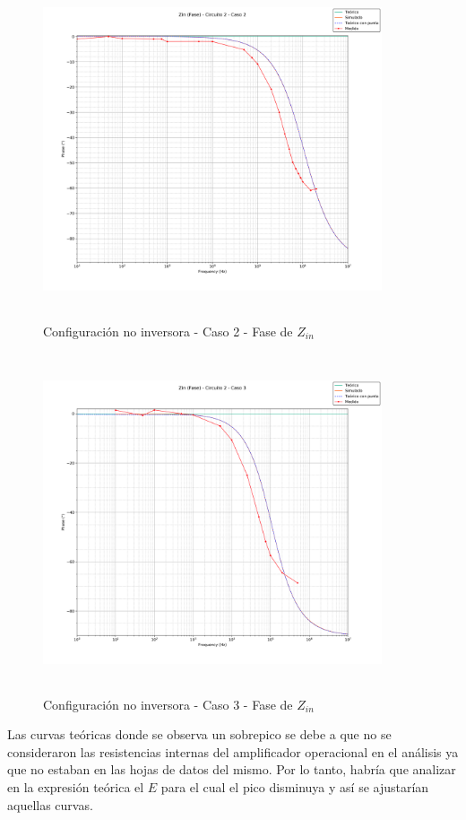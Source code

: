 \begin{figure}[H] %
	\centering
	\includegraphics[width=10cm,height=10cm,keepaspectratio]{../EJ1/00GRAFICOS/c2c2/c2c2zinFASE.png}
	\caption{Configuración no inversora - Caso 2 - Fase de $Z_{in}$}
	\label{c2c2zinP}
\end{figure}


\begin{figure}[H] %
	\centering
	\includegraphics[width=10cm,height=10cm,keepaspectratio]{../EJ1/00GRAFICOS/c2c3/c2c3zinFASE.png}
	\caption{Configuración no inversora - Caso 3 - Fase de $Z_{in}$}
	\label{c2c3zinP}
\end{figure}

Las curvas te\'oricas donde se observa un sobrepico se debe a que no se consideraron las resistencias internas del amplificador operacional en el an\'alisis ya que no estaban en las hojas de datos del mismo. Por lo tanto, habr\'ia que analizar en la expresi\'on te\'orica el $E$ para el cual el pico disminuya y  as\'i se ajustar\'ian aquellas curvas.



